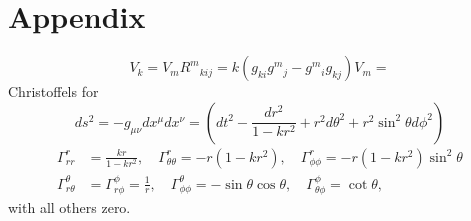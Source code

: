 \documentclass[10pt,letterpaper]{article}
\begin{document}
\section*{Appendix}
\begin{equation}
[\nabla_i,\nabla_j]V_k = V_m R^m{}_{kij}= k (g_{ki}g^{m}{}_j - g^m{}_{i}g_{kj})V_m = 
\end{equation}
Christoffels for 
\begin{equation}
ds^2 = -g_{\mu\nu}dx^\mu dx^\nu = \left(dt^2- \frac{dr^2}{1-kr^2} + r^2 d\theta^2 + r^2\sin^2\theta d\phi^2\right)
\end{equation}
\begin{align*}
\Gamma^r_{rr} &= \frac{kr}{1-kr^2},\quad \Gamma^r_{\theta\theta} = -r(1-kr^2),\quad \Gamma^r_{\phi\phi} = -r(1-kr^2)\sin^2\theta\\
\Gamma^\theta_{r\theta} &= \Gamma^{\phi}_{r\phi} = \frac{1}{r},\quad \Gamma^{\theta}_{\phi\phi} = -\sin\theta\cos\theta, \quad \Gamma^{\phi}_{\theta\phi} = \cot\theta,
\end{align*}
with all others zero. 
\end{document}
